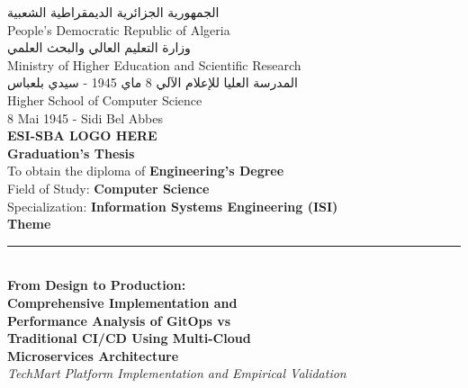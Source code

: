 \thispagestyle{empty}

\begin{center}

{\large الجمهورية الجزائرية الديمقراطية الشعبية} \\[0.3cm]
{\large People's Democratic Republic of Algeria} \\[0.5cm]

{\large وزارة التعليم العالي والبحث العلمي} \\[0.3cm]
{\large Ministry of Higher Education and Scientific Research} \\[0.5cm]

{\large المدرسة العليا للإعلام الآلي 8 ماي 1945 - سيدي بلعباس} \\[0.3cm]
{\large Higher School of Computer Science} \\[0.3cm]
{\large 8 Mai 1945 - Sidi Bel Abbes} \\[1.5cm]

{\Large \textbf{ESI-SBA LOGO HERE}} \\[1.5cm]

{\LARGE \textbf{Graduation's Thesis}} \\[0.8cm]

{\large To obtain the diploma of \textbf{Engineering's Degree}} \\[0.3cm]
{\large Field of Study: \textbf{Computer Science}} \\[0.3cm]
{\large Specialization: \textbf{Information Systems Engineering (ISI)}} \\[1.5cm]

{\Large \textbf{Theme}} \\[0.5cm]
\rule{12cm}{0.5pt} \\[0.8cm]

{\LARGE \textbf{From Design to Production:}} \\[0.3cm]
{\LARGE \textbf{Comprehensive Implementation and}} \\[0.3cm]
{\LARGE \textbf{Performance Analysis of GitOps vs}} \\[0.3cm]
{\LARGE \textbf{Traditional CI/CD Using Multi-Cloud}} \\[0.3cm]
{\LARGE \textbf{Microservices Architecture}} \\[0.5cm]

{\large \textit{TechMart Platform Implementation and Empirical Validation}} \\[1cm]


\end{center}
